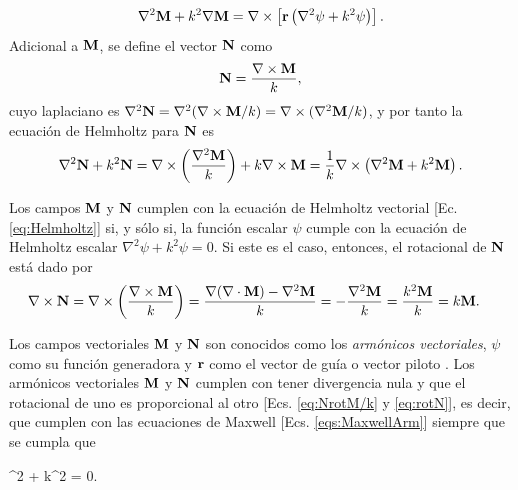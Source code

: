	\begin{align}
	\nabla^2 \vb{M} + k^2 \nabla\vb{M}  = \nabla\times\left[\vb{r}\left( \nabla^2\psi+k^2\psi \right) \right].
	\end{align}
Adicional a $\vb{M}$, se define el vector $\vb{N}$ como \cite{bohren1998absorption} 
	\begin{align}
	\vb{N} = \frac{\nabla\times \vb{M}}{k}, \label{eq:NrotM/k}
	\end{align}
cuyo laplaciano es $\nabla^2 \vb{N} = \nabla^2( \nabla\times \vb{M} /k) =  \nabla\times (\nabla^2\vb{M} /k) $, y por tanto la ecuación de Helmholtz para $\vb{N}$ es
	\begin{align*}
	\nabla^2 \vb{N} + k^2 \vb{N} =  \nabla\times \left( \frac{\nabla^2 \vb{M}}{k} \right) + k \nabla\times \vb{M} 
		 = \frac{1}{k} \nabla\times \left( \nabla^2 \vb{M} + k^2  \vb{M} \right).
	\end{align*}\vspace*{-1em}
	
Los campos $\vb{M}$ y $\vb{N}$ cumplen con la  ecuación de Helmholtz vectorial [Ec. \eqref{eq:Helmholtz}] si, y sólo si, la función escalar $\psi$ cumple con la ecuación de Helmholtz escalar $\nabla^2 \psi + k^2 \psi = 0$. Si este es el caso, entonces, el rotacional de $\vb{N}$ está dado por
	\begin{align}
	\nabla\times \vb{N} &= \nabla\times \qty(\frac{\nabla\times \vb{M}}{k})  
						= \frac{\nabla\qty(\nabla\cdot\vb{M})-\nabla^2\vb{M}}{k}
						= - \frac{\nabla^2 \vb{M}}{k}
						= \frac{k^2 \vb{M}}{k}
						= k \vb{M}.\label{eq:rotN}
	\end{align}\vspace*{-1em}
	
Los campos vectoriales $\vb{M}$ y $\vb{N}$ son conocidos como los \emph{armónicos  vectoriales}, $\psi$ como su función generadora y $\vb{r}$ como el vector de guía o vector piloto \cite{bohren1998absorption}. Los armónicos vectoriales $\vb{M}$ y $\vb{N}$  cumplen con tener divergencia nula y que el rotacional de uno es proporcional al otro [Ecs. \eqref{eq:NrotM/k} y \eqref{eq:rotN}], es decir, que cumplen con las ecuaciones de Maxwell [Ecs. \eqref{eqs:MaxwellArm}] siempre que se cumpla que\vspace*{-.75em}
	\begin{tcolorbox}[title = $\mathbf{\psi}$: Función generadora de los armónicos  vectoriales, ams align ]
	\nabla^2 \psi + k^2 \psi  = 0.\label{eq:AV_psi}
	\end{tcolorbox}


